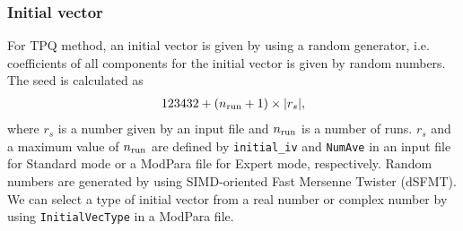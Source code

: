 \subsubsection*{Initial vector}
For TPQ method, an initial vector is given by using a random generator, i.e. coefficients of all components for the initial vector is given by random numbers. The seed is calculated as 
\begin{align}
123432+(n_{\rm run}+1) \times |r_s|,
\end{align}
where $r_s$ is a number given by an input file and $n_{\rm run}$ is a number of runs. $r_s$ and a maximum value of $n_{\rm run}$ are defined by \verb|initial_iv| and \verb|NumAve| in an input file for Standard mode or a ModPara file for Expert mode, respectively. Random numbers are generated by using SIMD-oriented Fast Mersenne Twister (dSFMT)\cite{Mutsuo2008}. We can select a type of initial vector from a real number or complex number by using \verb|InitialVecType| in a ModPara file.
